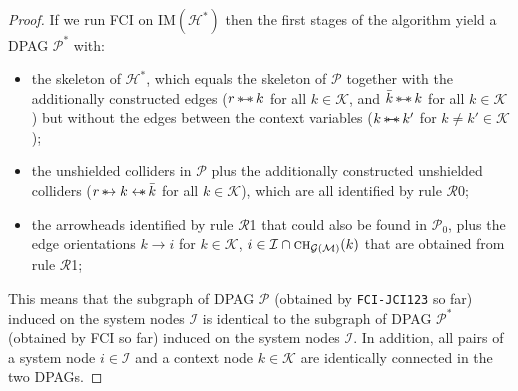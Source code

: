 \documentclass[twoside,11pt]{article}
\newcommand\C[1]{\mathcal{#1}}
\newcommand\mathbfsc[1]{\text{\normalfont\scshape#1}}
\newcommand\chsub[2]{\mathbfsc{ch}_{#1}(#2)}
\newcommand{\ots}{\leftarrow\mkern-13mu\ast\,}
\newcommand{\sto}{\,\ast\mkern-13mu\to}
\newcommand{\sts}{\,\ast\mkern-10mu\relbar\mkern-10mu\ast\,}
\newcommand{\IM}{\mathrm{IM}}
\newcommand{\alg}[1]{\texttt{#1}}
\begin{document}
\begin{proof}
  If we run FCI on $\IM(\C{H}^*)$ then the first stages of the algorithm yield a DPAG $\C{P}^*$ with:
  \begin{itemize}
    \item the skeleton of $\C{H}^*$, which equals the skeleton of $\C{P}$ together with the additionally constructed edges ($r \sts k$ for all $k \in \C{K}$, and $\bar{k} \sts k$ for all $k \in \C{K}$) but without the edges between the context variables ($k \sts k'$ for $k \ne k' \in \C{K}$);
    \item the unshielded colliders in $\C{P}$ plus the additionally constructed unshielded colliders ($r \sto k \ots \bar{k}$
      for all $k \in \C{K}$), which are all identified by rule $\C{R}$0;
    \item the arrowheads identified by rule $\C{R}$1 that could also be found in $\C{P}_0$, plus the edge orientations $k \to i$ for $k \in \C{K}$, $i \in \C{I} \cap \chsub{\C{G}(\C{M})}{k}$ that are obtained from rule $\C{R}$1;
  \end{itemize}
  This means that the subgraph of DPAG $\C{P}$ (obtained by \alg{FCI-JCI123} so far) induced on the system nodes $\C{I}$ is identical to the subgraph of DPAG $\C{P}^*$ (obtained by FCI so far) induced on the system nodes $\C{I}$. 
  In addition, all pairs of a system node $i \in \C{I}$ and a context node $k \in \C{K}$ are identically connected in the two DPAGs.


\end{proof}
\end{document}
